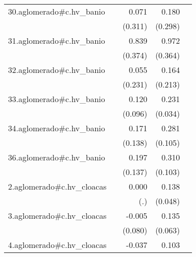 {\begin{longtable}{l*{4}{D{.}{.}{-1}}}
\addlinespace
30.aglomerado#c.hv\_banio&                     &       0.071         &       0.180         &                     \\
            &                     &     (0.311)         &     (0.298)         &                     \\
\addlinespace
31.aglomerado#c.hv\_banio&                     &       0.839\sym{*}  &       0.972\sym{**} &                     \\
            &                     &     (0.374)         &     (0.364)         &                     \\
\addlinespace
32.aglomerado#c.hv\_banio&                     &       0.055         &       0.164         &                     \\
            &                     &     (0.231)         &     (0.213)         &                     \\
\addlinespace
33.aglomerado#c.hv\_banio&                     &       0.120         &       0.231\sym{***}&                     \\
            &                     &     (0.096)         &     (0.034)         &                     \\
\addlinespace
34.aglomerado#c.hv\_banio&                     &       0.171         &       0.281\sym{**} &                     \\
            &                     &     (0.138)         &     (0.105)         &                     \\
\addlinespace
36.aglomerado#c.hv\_banio&                     &       0.197         &       0.310\sym{**} &                     \\
            &                     &     (0.137)         &     (0.103)         &                     \\
\addlinespace
2.aglomerado#c.hv\_cloacas&                     &       0.000         &       0.138\sym{**} &                     \\
            &                     &         (.)         &     (0.048)         &                     \\
\addlinespace
3.aglomerado#c.hv\_cloacas&                     &      -0.005         &       0.135\sym{*}  &                     \\
            &                     &     (0.080)         &     (0.063)         &                     \\
\addlinespace
4.aglomerado#c.hv\_cloacas&                     &      -0.037         &       0.103\sym{**} &                     \\

\end{longtable}}
